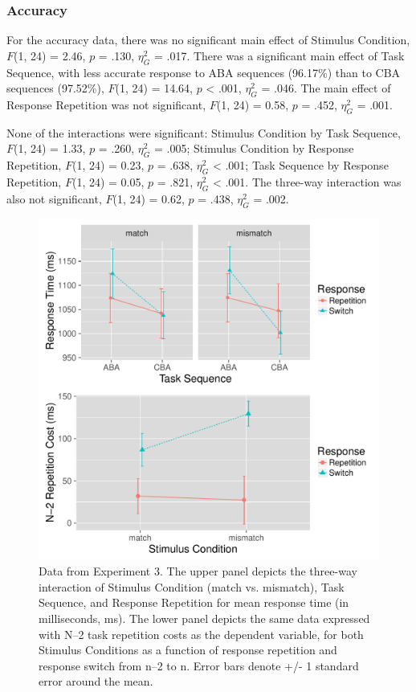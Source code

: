 \documentclass[a4paper, doc, natbib]{apa6}
\begin{document}
\subsubsection{Accuracy}
For the accuracy data, there was no significant main effect of Stimulus Condition, $F$(1, 24) = 2.46, $p$ = .130, $\eta_G^2$ = .017. There was a significant main effect of Task Sequence, with less accurate response to ABA sequences (96.17\%) than to CBA sequences (97.52\%), $F$(1, 24) = 14.64, $p$ < .001, $\eta_G^2$ = .046. The main effect of Response Repetition was not significant, $F$(1, 24) = 0.58, $p$ = .452, $\eta_G^2$ = .001.

None of the interactions were significant: Stimulus Condition by Task Sequence, $F$(1, 24) = 1.33, $p$ = .260, $\eta_G^2$ = .005; Stimulus Condition by Response Repetition, $F$(1, 24) = 0.23, $p$ = .638, $\eta_G^2$ < .001; Task Sequence by Response Repetition, $F$(1, 24) = 0.05, $p$ = .821, $\eta_G^2$ < .001. The three-way interaction was also not significant, $F$(1, 24) = 0.62, $p$ = .438, $\eta_G^2$ = .002.

\begin{figure}
\begin{center}
\includegraphics[width = \textwidth]{Images/all_rts_Experiment3.pdf}
\caption{Data from Experiment 3. The upper panel depicts the three-way interaction of Stimulus Condition (match vs. mismatch), Task Sequence, and Response Repetition for mean response time (in milliseconds, ms). The lower panel depicts the same data expressed with N--2 task repetition costs as the dependent variable, for both Stimulus Conditions as a function of response repetition and response switch from n--2 to n. Error bars denote +/- 1 standard error around the mean.}
\label{fig:Experiment3}
\end{center}
\end{figure}
\end{document}
